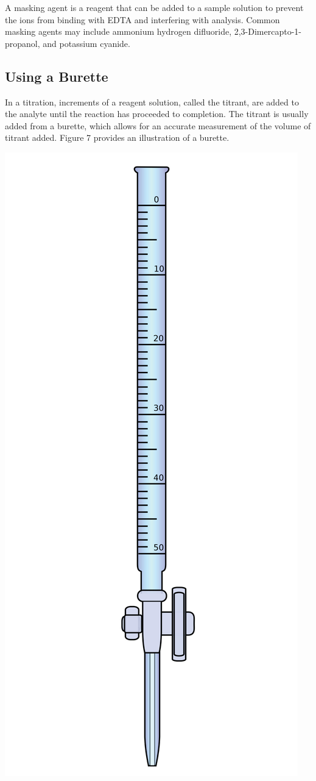 \documentclass{article}
\begin{document}
A masking agent is a reagent that can be added to a sample solution to prevent the ions from
binding with EDTA and interfering with analysis.
Common masking agents may include ammonium hydrogen difluoride,
2,3-Dimercapto-1-propanol, and potassium cyanide.


\subsection{Using a Burette}
In a titration, increments of a reagent solution, called the titrant, are added to the analyte until
the reaction has proceeded to completion. The titrant is usually added from a burette, which allows
for an accurate measurement of the volume of titrant added.\cite{Harris}
Figure 7 provides an illustration of a burette.
\begin{center}
        \includegraphics[scale = 0.05]{buret}

\end{center}
\end{document}
